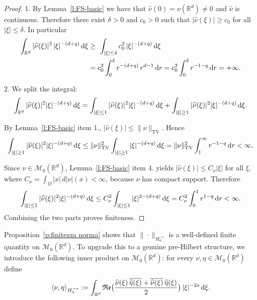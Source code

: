 \documentclass[12pt,a4paper,oneside]{amsart}
\theoremstyle{plain}
\theoremstyle{definition}
\numberwithin{equation}{section}
\numberwithin{figure}{section}
\numberwithin{table}{section}
\theoremstyle{remark}
\newcommand{\R}{\mathbb{R}}
\newcommand{\dd}{\textup{d}}
\newcommand{\calM}{\mathcal{M}}
\newcommand{\Fhat}[1]{\widehat{#1}}
\begin{document}
\begin{proof}
1. By Lemma~\ref{l:FS-basic} we have that $\Fhat{\nu}(0)=\nu(\R^d)\neq 0$ and $\Fhat{\nu}$ is continuous. Therefore there exist $\delta>0$ and $c_0>0$ such that
$|\Fhat{\nu}(\xi)|\ge c_0$ for all $|\xi|\le \delta$. In particular
\begin{align*}
\int_{\R^d}|\Fhat{\nu}(\xi)|^2\,|\xi|^{-(d+q)}\,\dd\xi&
 \ge\ \int_{|\xi|\le\delta} c_0^2\,|\xi|^{-(d+q)}\,\dd\xi\\
 &=c_0^2\int_0^\delta r^{-(d+q)}\,r^{d-1}\,\dd r=c_0^2\int_0^\delta r^{-1-q}\,\dd r=+\infty.    
\end{align*}

2. We split the integral:
\begin{equation*}
\int_{\R^d}|\Fhat{\nu}(\xi)|^2|\xi|^{-(d+q)}\,\dd\xi
=\int_{|\xi|\le 1}|\Fhat{\nu}(\xi)|^2|\xi|^{-(d+q)}\,\dd\xi+\int_{|\xi|\ge 1}|\Fhat{\nu}(\xi)|^2|\xi|^{-(d+q)}\,\dd\xi.
\end{equation*}



By Lemma~\ref{l:FS-basic} item 1., $|\Fhat{\nu}(\xi)|\le \|\nu\|_{\mathrm{TV}}$. Hence
\begin{equation*}
\int_{|\xi|\ge 1}|\Fhat{\nu}(\xi)|^2|\xi|^{-(d+q)}\,\dd\xi
\le \|\nu\|_{\mathrm{TV}}^2 \int_{|\xi|\ge 1}|\xi|^{-(d+q)}\,\dd\xi=\|\nu\|_{\mathrm{TV}}^2\int_1^\infty r^{-1-q}\,\dd r<\infty.
\end{equation*}

Since $\nu\in\calM_0(\R^d)$, Lemma~\ref{l:FS-basic} item 4. yields
$|\Fhat{\nu}(\xi)|\le C_\nu|\xi|$ for all $\xi$, where $C_\nu=\int_\Omega |x|\,d|\nu|(x)<\infty$, because $\nu$ has compact support.
Therefore
\begin{equation*}
\int_{|\xi|\le 1}|\Fhat{\nu}(\xi)|^2|\xi|^{-(d+q)}\,\dd\xi
\le C_\nu^2\int_{|\xi|\le 1}|\xi|^{2-(d+q)}\,\dd\xi= C^2_{\nu}\int_0^1 r^{1-q}\,\dd r<\infty.
\end{equation*}
Combining the two parts proves finiteness.
\end{proof}
% 
Proposition~\ref{p:finitezza norma} shows that $\|\cdot\|_{H_0^{-s}}$ 
is a well-defined finite quantity on $\calM_0(\R^d)$. To upgrade this 
to a genuine pre-Hilbert structure, we introduce the following inner 
product on $\calM_0(\R^d)$: for every $\nu, \eta \in \calM_0(\R^d)$ define
\begin{equation}\label{e:innerprod}
\langle \nu,\eta\rangle_{H_0^{-s}}
:=\int_{\R^d}\mathfrak{Re}\big(\frac{\Fhat{\nu}(\xi)\,\overline{\Fhat{\eta}(\xi)}+\overline{\Fhat{\nu}(\xi)}\,{\Fhat{\eta}(\xi)}}{2}\big)\,|\xi|^{-2s}\,\dd\xi.
\end{equation}
\end{document}
